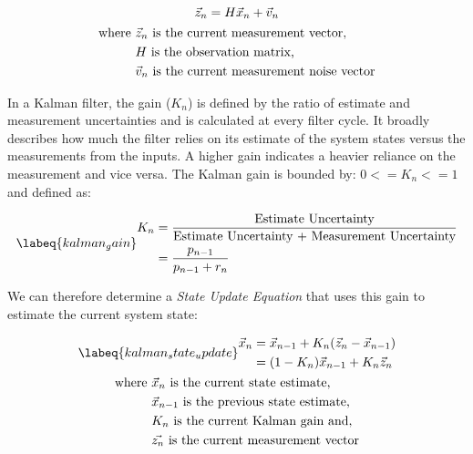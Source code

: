 \begin{gather}
    \vec{z}_n = H\vec{x}_n + \vec{v}_n \\
    \begin{aligned}
        \text{where } &\vec{z}_n \text{ is the current measurement vector,} \\
                      &H \text{ is the observation matrix,} \\
                      &\vec{v}_n \text{ is the current measurement noise vector}
    \end{aligned} \notag
\end{gather}

In a Kalman filter, the gain ($K_n$) is defined by the ratio of estimate and measurement uncertainties and is calculated at every filter cycle.
It broadly describes how much the filter relies on its estimate of the system states versus the measurements from the inputs.
A higher gain indicates a heavier reliance on the measurement and vice versa.
The Kalman gain is bounded by: $0 <= K_n <= 1$ and defined as:

\begin{equation} \labeq{kalman_gain}
    \begin{aligned}
        K_n &= \frac{\text{Estimate Uncertainty}}{\text{Estimate Uncertainty + Measurement Uncertainty}} \\
            &= \frac{p_{n-1}}{p_{n-1} + r_n}
    \end{aligned}
\end{equation}

We can therefore determine a \textit{State Update Equation} that uses this gain to estimate the current system state:

\begin{gather} \labeq{kalman_state_update}
    \begin{aligned}
        \vec{x}_{n} &= \vec{x}_{n-1} + K_n(\vec{z}_n - \vec{x}_{n-1}) \\
                    &= (1-K_n)\vec{x}_{n-1} + K_n \vec{z}_n
    \end{aligned} \\
    \begin{aligned}
        \text{where } &\vec{x}_n \text{ is the current state estimate,} \\
                      &\vec{x}_{n-1} \text{ is the previous state estimate,} \\
                      &K_n \text{ is the current Kalman gain and,} \\
                      &\vec{z_n} \text{ is the current measurement vector}
    \end{aligned} \notag
\end{gather}

